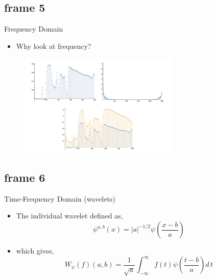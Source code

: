 \documentclass[xcolor=x11names,compress]{beamer}
\renewcommand{\(}{\begin{columns}}
\renewcommand{\)}{\end{columns}}
\newcommand{\<}[1]{\begin{column}{#1}}
\renewcommand{\>}{\end{column}}
\begin{document}

\subsection{frame 5}
\begin{frame}{Frequency Domain}
\begin{itemize}
\item Why look at frequency?
\end{itemize}
\begin{figure}[h]
   \centering
   \includegraphics[width=3in]{Fourier.pdf}
   \label{fig:example}
\end{figure}
\end{frame}


\subsection{frame 6}
\begin{frame}{Time-Frequency Domain (wavelets)}
\begin{itemize}
\item The individual wavelet defined as, $$\psi^{a,b}(x)=\left\vert a\right\vert^{-1/2}\psi \left(\frac{x-b}{a}\right)$$
\item which gives, $$W_{\psi}(f)(a,b)=\frac{1}{\sqrt{a}}\int_{-\infty}^{\infty}f(t)\psi \left(\frac{t-b}{a}\right)d\,t$$
\end{itemize}
\begin{center}
\end{center}
\end{frame}

\end{document}
